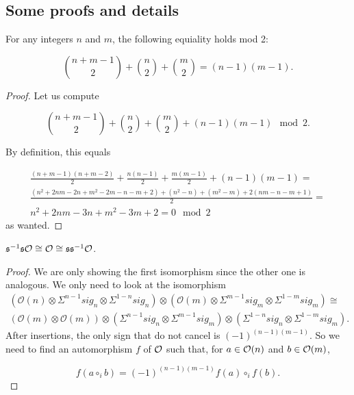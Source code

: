 \documentclass[twoside]{article}
\begin{document}
\begin{appendices}
\appendix
\gdef\thesection{Appendix \Alph{section}}
\section{Some proofs and details}



\begin{lemma}\label{binom}
For any integers $n$ and $m$, the following equiality  holds mod 2:

$$\binom{n+m-1}{2}+\binom{n}{2}+\binom{m}{2}=(n-1)(m-1).$$
\end{lemma}
\begin{proof}
Let us compute 

$$\binom{n+m-1}{2}+\binom{n}{2}+\binom{m}{2}+(n-1)(m-1)\mod 2.$$

By definition, this equals

\begin{gather*}
\frac{(n+m-1)(n+m-2)}{2}+\frac{n(n-1)}{2}+\frac{m(m-1)}{2}+(n-1)(m-1)=\\
\frac{(n^2+2nm-2n+m^2-2m-n-m+2)+(n^2-n)+(m^2-m)+2(nm-n-m+1)}{2}=\\
n^2+2nm-3n+m^2-3m+2=0\mod 2
\end{gather*}
as wanted.


\end{proof}

\begin{lemma}
$\mathfrak{s}^{-1}\mathfrak{s}{\mathcal O}\cong{\mathcal O}\cong\mathfrak{s}\mathfrak{s}^{-1}{\mathcal O}$.
\end{lemma}
\begin{proof}
We are only showing the first isomorphism since the other one is analogous. We only need to look at the isomorphism
\begin{align*}
(\mathcal{O}(n)\otimes\Sigma^{n-1}sig_n\otimes \Sigma^{1-n}sig_n)\otimes (\mathcal{O}(m)\otimes\Sigma^{m-1}sig_m\otimes \Sigma^{1-m}sig_m)\cong\\ (\mathcal{O}(m)\otimes \mathcal{O}(m))\otimes (\Sigma^{n-1}sig_n\otimes \Sigma^{m-1}sig_m)\otimes (\Sigma^{1-n}sig_n\otimes \Sigma^{1-m}sig_m).
\end{align*}
After insertions, the only sign that do not cancel is $(-1)^{(n-1)(m-1)}$. So we need to find an automorphism $f$ of ${\mathcal O}$ such that, for $a\in{\mathcal O}(n)$ and $b\in{\mathcal O}(m)$,

$$f(a\circ_i b)=(-1)^{(n-1)(m-1)}f(a)\circ_i f(b).$$


\end{proof}
\end{appendices}
\end{document}
